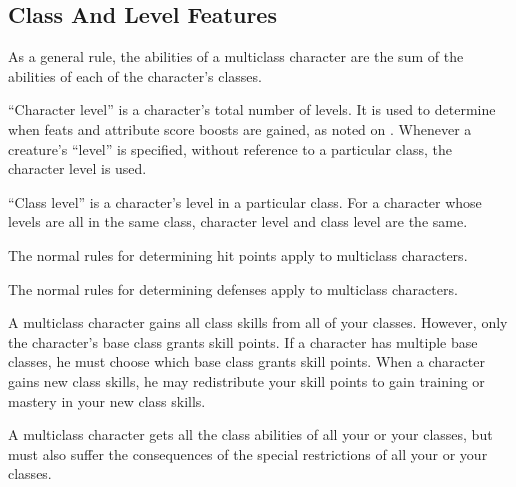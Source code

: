     \subsection{Class And Level Features}
        As a general rule, the abilities of a multiclass character are the sum
        of the abilities of each of the character's classes.

        ``Character level'' is a character's total number of levels.
        It is used to determine when feats and attribute score boosts are gained, as noted on .
        Whenever a creature's ``level'' is specified, without reference to a particular class, the character level is used.

        \par ``Class level'' is a character's level in a particular class.
        For a character whose levels are all in the same class, character level and class level are the same.

        The normal rules for determining hit points apply to multiclass characters.

        The normal rules for determining defenses apply to multiclass characters.

        A multiclass character gains all class skills from all of your classes.
        However, only the character's base class grants skill points.
        If a character has multiple base classes, he must choose which base class grants skill points.
        When a character gains new class skills, he may redistribute your skill points to gain training or mastery in your new class skills.

        A multiclass character gets all the class abilities of all your or your classes, but must also suffer the consequences of the special restrictions of all your or your classes.

